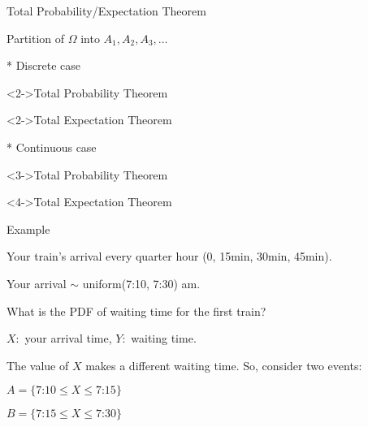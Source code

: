 \documentclass[handout,fleqn,aspectratio=169]{beamer}
\begin{document}
\begin{frame}{Total Probability/Expectation Theorem}

Partition of $\Omega$ into $A_1,A_2,A_3, \ldots$

\medskip

{
\small
* Discrete case
\medskip

\begin{block}<2->{Total Probability Theorem}
 \end{block}

\begin{block}<2->{Total Expectation Theorem}
\end{block}
}
{
\small
* Continuous case
\medskip

\begin{block}<3->{Total Probability Theorem}
 \end{block}

\begin{block}<4->{Total Expectation Theorem}
\end{block}
}

\end{frame}

\begin{frame}{Example }

{

\bigskip


\plitemsep 0.1in
\bci 
\item<1-> Your train's arrival every quarter hour (0, 15min, 30min, 45min). 

\item<1-> Your arrival $\sim$ uniform(7:10, 7:30) am. 

\item<2-> What is the PDF of waiting time for the first train?

\item<3-> $X:$ your arrival time, $Y:$ waiting time.

\item<4-> The value of $X$ makes a different waiting time. So, consider two events:

\medskip
$A = \{\text{7:10} \leq X \leq \text{7:15} \}$

\medskip
$B = \{\text{7:15} \leq X \leq \text{7:30} \}$

\eci
}
{
\small
{}
}

\end{frame}
\end{document}
